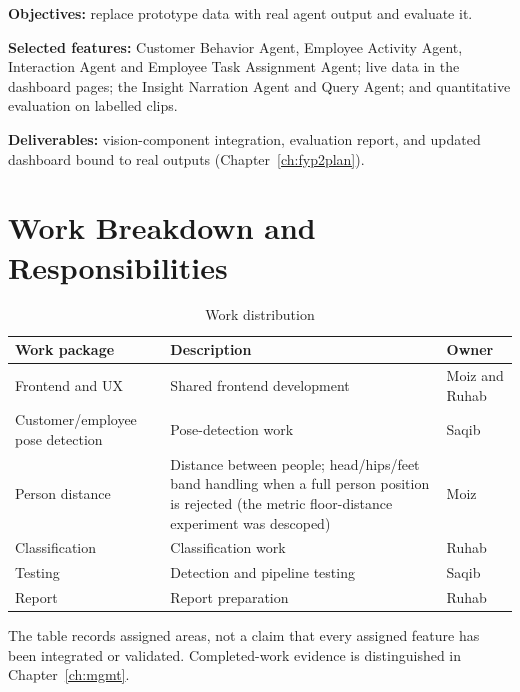\textbf{Objectives:} replace prototype data with real agent output and evaluate it.

\textbf{Selected features:} Customer Behavior Agent, Employee Activity Agent, Interaction Agent and Employee Task Assignment Agent; live data in the dashboard pages; the Insight Narration Agent and Query Agent; and quantitative evaluation on labelled clips.

\textbf{Deliverables:} vision-component integration, evaluation report, and updated dashboard bound to real outputs (Chapter~\ref{ch:fyp2plan}).

\section{Work Breakdown and Responsibilities}
\begin{table}[H]
\centering
\caption{Work distribution}
\begin{tabular}{P{0.3\textwidth}P{0.45\textwidth}P{0.15\textwidth}}
\toprule
Work package & Description & Owner\\
\midrule
Frontend and UX & Shared frontend development & Moiz and Ruhab\\
Customer/employee pose detection & Pose-detection work & Saqib\\
Person distance & Distance between people; head/hips/feet band handling when a full person position is rejected (the metric floor-distance experiment was descoped) & Moiz\\
Classification & Classification work & Ruhab\\
Testing & Detection and pipeline testing & Saqib\\
Report & Report preparation & Ruhab\\
\bottomrule
\end{tabular}
\end{table}
The table records assigned areas, not a claim that every assigned feature has been integrated or validated. Completed-work evidence is distinguished in Chapter~\ref{ch:mgmt}.

